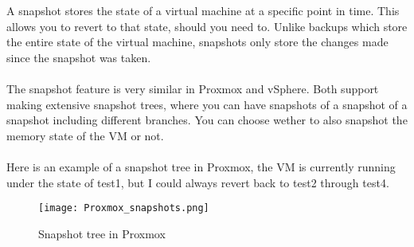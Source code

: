 A snapshot stores the state of a virtual machine at a specific point in time. This allows you to revert to that state, should you need to. Unlike backups which store the entire state of the virtual machine, snapshots only store the changes made since the snapshot was taken.
\\\\
The snapshot feature is very similar in Proxmox and vSphere. Both support making extensive snapshot trees, where you can have snapshots of a snapshot of a snapshot including different branches. You can choose wether to also snapshot the memory state of the VM or not.
\\\\
Here is an example of a snapshot tree in Proxmox, the VM is currently running under the state of test1, but I could always revert back to test2 through test4.

\begin{figure}[H]
	\texttt{[image: Proxmox\_snapshots.png]} %
	\caption{Snapshot tree in Proxmox} %
	\label{fig:Snapshot tree in Proxmox} %
\end{figure}